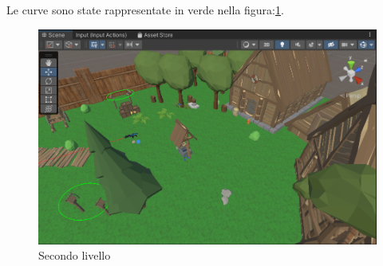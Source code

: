 \documentclass[
a4paper,
cleardoublepage=empty,
headings=twolinechapter,
numbers=autoenddot,
]{scrbook}
\begin{document}
    Le curve sono state rappresentate in verde nella figura:\ref{fig:mappa}.
     \begin{figure}[h]
    	\centering
    	\includegraphics[width=0.7\linewidth]{image/mappa}
    	\caption{Secondo livello}
    	\label{fig:mappa}
    \end{figure}
\end{document}
